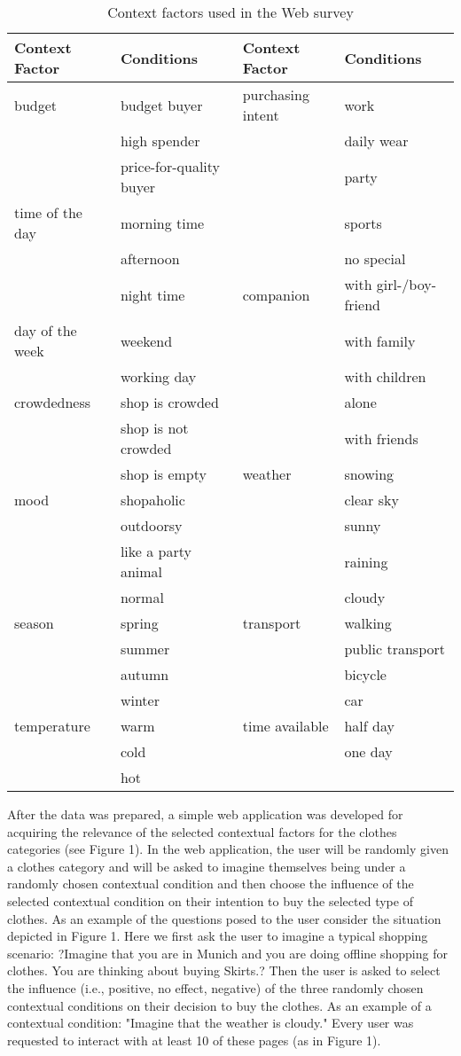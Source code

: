 \begin{table}[H]
	\centering
	\caption{Context factors used in the Web survey}
	\label{tab:factors}
	\begin{tabular}{p{1.1in}p{1.6in}|p{1.1in}p{1.6in}} \hline
		Context Factor & Conditions  & Context Factor & Conditions  \\ \hline 
		budget & budget buyer & purchasing intent & work \\
 		& high spender &  & daily wear \\
 		& price-for-quality buyer &  & party \\
		time of the day & morning time &  & sports \\
 		& afternoon &  & no special \\
 		& night time & companion & with girl-/boy-friend \\
		day of the week & weekend &  & with family  \\
		& working day &  & with children \\
		crowdedness & shop is crowded &  & alone \\
		& shop is not crowded &  & with friends \\
		& shop is empty & weather  & snowing \\
		mood & shopaholic &  & clear sky \\
		& outdoorsy &  & sunny \\
		& like a party animal &  & raining \\
		& normal &  & cloudy \\	
		season & spring & transport & walking \\
 		& summer &  & public transport \\
 		& autumn &  & bicycle \\
 		& winter &  & car \\
		temperature & warm & time available & half day \\
 		& cold &  & one day \\
 		& hot \\
	\end{tabular}
\end{table}


After the data was prepared, a simple web application was developed for acquiring the relevance of the selected contextual factors for the clothes categories (see Figure 1). In the web application, the user will be randomly given a clothes category and will be asked to imagine themselves being under a randomly chosen contextual condition and then choose the influence of the selected contextual condition on their intention to buy the selected type of clothes. As an example of the questions posed to the user consider the situation depicted in Figure 1. Here we first ask the user to imagine a typical shopping scenario: ?Imagine that you are in Munich and you are doing offline shopping for clothes. You are thinking about buying Skirts.? Then the user is asked to select the influence (i.e., positive, no effect, negative) of the three randomly chosen contextual conditions on their decision to buy the clothes. As an example of a contextual condition: "Imagine that the weather is cloudy." Every user was requested to interact with at least 10 of these pages (as in Figure 1). 


